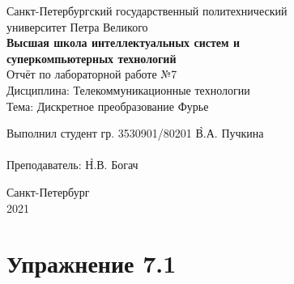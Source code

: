 \documentclass[a4paper, 14pt]{extarticle}
\begin{document}
    \begin{center}
        \begin{center}
            \hfill \break
            \normalsize{Санкт-Петербургский государственный политехнический}\\
            \normalsize{университет Петра Великого}\\
            \hfill \break
            \normalsize{\textbf{Высшая школа интеллектуальных систем и}}\\
            \normalsize{\textbf{суперкомпьютерных технологий}}\\
            \hfill \break
            \hfill \break
            \hfill \break
            \hfill \break
            \hfill \break
            \normalsize{Отчёт по лабораторной работе №7}\\
            \normalsize{Дисциплина: Телекоммуникационные технологии}\\
            \normalsize{Тема: Дискретное преобразование Фурье}\\
        \end{center}
        \hfill \break
        \hfill \break
        \hfill \break
        \hfill \break
        \hfill \break
        \hfill \break
        \hfill \break
        \hfill \break
        \hfill \break
        \hfill \break
        \begin{tabbing}
            Выполнил студент гр. 3530901/80201 \`В.А. Пучкина\\
            \\
            Преподаватель: \`Н.В. Богач\\
        \end{tabbing}
        \hfill \break
        \hfill \break
        \hfill \break
        \hfill \break
        \begin{center}
            Санкт-Петербург\\
            2021
        \end{center}
        \thispagestyle{empty}
    \end{center}

    \newpage
    \tableofcontents

    \newpage
    \listoffigures

    \newpage
    \lstlistoflistings

    \newpage
    \section{Упражнение 7.1}
    \label{sec:task1}
\end{document}
